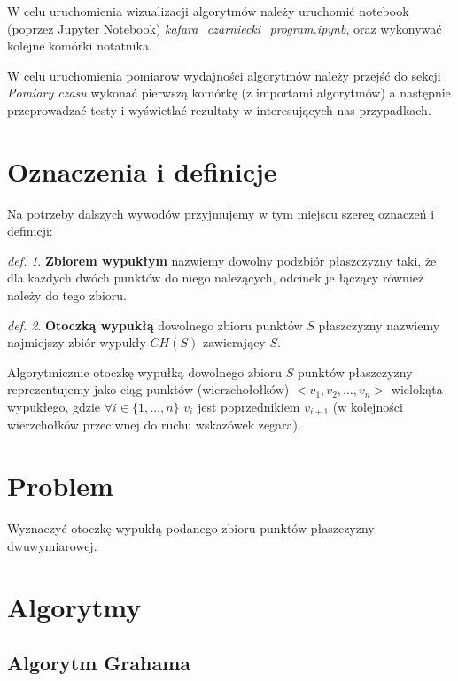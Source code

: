 \documentclass[11pt]{article}
\theoremstyle{remark} \newtheorem{definition}{def.}
\theoremstyle{definition} \newtheorem{twierdzenie}{tw.}
\newcommand{\bold}[1]{\textbf{#1}}
\begin{document}
W celu uruchomienia wizualizacji algorytmów należy uruchomić notebook (poprzez Jupyter Notebook) \emph{kafara\_czarniecki\_program.ipynb}, oraz wykonywać kolejne komórki notatnika.

W celu uruchomienia pomiarow wydajności algorytmów należy przejść do sekcji \emph{Pomiary czasu} wykonać pierwszą komórkę (z importami algorytmów) a następnie przeprowadzać testy i wyświetlać rezultaty w 
interesujących nas przypadkach. 


\section{Oznaczenia i definicje}

Na potrzeby dalszych wywodów przyjmujemy w tym miejscu szereg oznaczeń i definicji:\\

\begin{definition}
    \bold{Zbiorem wypukłym} nazwiemy dowolny podzbiór płaszczyzny taki, że dla każdych dwóch punktów do niego należących, odcinek je łączący również należy do tego zbioru.
\end{definition}

\medskip

\begin{definition}
    \bold{Otoczką wypukłą} dowolnego zbioru punktów $S$ płaszczyzny nazwiemy najmiejszy zbiór wypukły $CH(S)$ zawierający $S$. 
\end{definition}

\medskip

Algorytmicznie otoczkę wypułką dowolnego zbioru $S$ punktów płaszczyzny reprezentujemy jako ciąg punktów (wierzchołołków) $<v_1, v_2, \ldots, v_n>$ wielokąta wypukłego, gdzie $\forall i \in \{1, \ldots, n\}$ $v_i$ jest 
poprzednikiem $v_{i+1}$ (w kolejności wierzchołków przeciwnej do ruchu wskazówek zegara).


\section{Problem}

Wyznaczyć otoczkę wypukłą podanego zbioru punktów płaszczyzny dwuwymiarowej. 

\section{Algorytmy}

\subsection{Algorytm Grahama}
\end{document}
